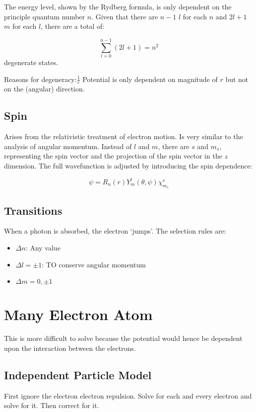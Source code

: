 \documentclass[12pt]{article}
\begin{document}
The energy level, shown by the Rydberg formula, is only dependent on the principle quantum number $n$. Given that there are $n-1$ $l$ for each $n$ and $2l+1$ $m$ for each $l$, there are a total of:

\[\sum^{n-1}_{l=0} (2l+1) = n^2\] degenerate states.

Reasons for degeneracy:$\frac1r$ Potential is only dependent on magnitude of $r$ but not on the (angular) direction. 

\subsection{Spin}

Arises from the relativistic treatment of electron motion. Is very similar to the analysis of angular momentum. Instead of $l$ and $m$, there are $s$ and $m_s$, representing the spin vector and the projection of the spin vector in the $z$ dimension. The full wavefunction is adjusted by introducing the spin dependence:

\[\psi = R_n(r)Y^l_m(\theta, \psi) \chi^s_{m_s}\]

\subsection{Transitions}

When a photon is absorbed, the electron `jumps'. The selection rules are:

\begin{itemize}
    \item $\Delta n$: Any value
    \item $\Delta l = \pm 1$: TO conserve angular momentum
    \item $\Delta m = 0, \pm 1$
\end{itemize}    
    
    
\section{Many Electron Atom}

This is more difficult to solve because the potential would hence be dependent upon the interaction between the electrons. 

\subsection{Independent Particle Model}
First ignore the electron electron repulsion. Solve for each and every electron and solve for it. Then correct for it.
\end{document}
